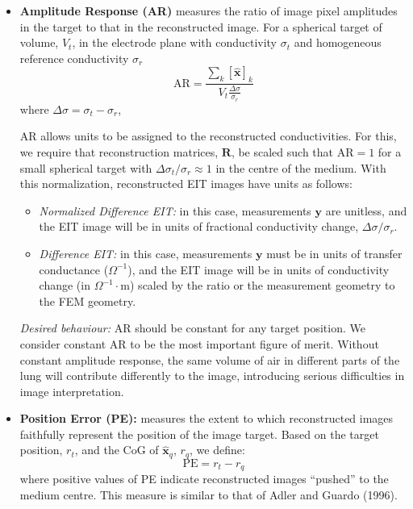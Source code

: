 \documentclass[12pt]{iopart}
\newcommand{\xH}{\mbox{$\mathbf{\hat x}$}}
\newcommand{\yB}{\mbox{$\mathbf{y}$}}
\newcommand{\RB}{\mbox{$\mathbf{R}$}}
\begin{document}
\begin{itemize}

\item
{\bf Amplitude Response (AR)}
measures the ratio of image pixel amplitudes in the
target to that in the reconstructed image.
For a spherical target of volume, $V_t$, in the electrode
plane with
conductivity $\sigma_t$ and homogeneous reference
conductivity $\sigma_r$
\begin{equation}
\mathrm{AR} =  \frac{
    \sum_k [\xH]_k
  }{
    V_t \frac{\Delta\sigma}{\sigma_r}
  }
\end{equation}
where $\Delta\sigma = \sigma_t - \sigma_r$,

AR allows units to be assigned to the 
reconstructed conductivities. For this, we 
require that reconstruction matrices, $\RB$, be
scaled such that AR$=1$ for 
a small spherical target with
 $\Delta\sigma_t/\sigma_r \approx 1$
in the centre of the medium.
With this normalization, reconstructed EIT images have
units as follows:
   \begin{itemize}
   \item {\em Normalized Difference EIT:}
in this case, measurements $\yB$ are unitless,
and the EIT image will be in units of fractional conductivity
change, $\Delta\sigma/\sigma_r$.
   \item {\em Difference EIT:}
in this case, measurements $\yB$ must be in units of
transfer conductance ($\Omega^{-1}$), and the EIT image
will be in units of conductivity change (in $\Omega^{-1}\cdot$m)
scaled by the ratio or the measurement geometry to
the FEM geometry.
   \end{itemize}


\hspace{5mm}
{\em Desired behaviour:}
AR should be constant for any target position. We consider
constant
AR to be the most important figure of merit. Without
constant amplitude response, the same volume of air in different parts
of the lung will contribute differently to the image, introducing
serious difficulties in image interpretation.

\item
{\bf Position Error (PE):}
measures the extent to which reconstructed images faithfully
represent the position of the image target. Based on the
target position, $r_t$, and the CoG of $\xH_q$, $r_q$, we define:
\begin{equation}
\mathrm{PE} = r_t - r_q
\end{equation}
where positive values of PE indicate reconstructed images
``pushed'' to the medium centre. This measure is similar
to that of Adler and Guardo (1996).


\end{itemize}
\end{document}
